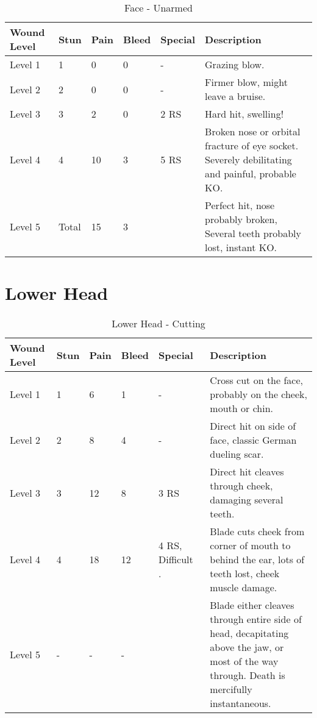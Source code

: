 \documentclass[oneside,11pt,english]{book}
\begin{document}
\begin{table}[!hb] %
	\caption{Face - Unarmed}
	\label{wound:Face - Unarmed}
	\begin{tabu} to 
Wound Level &Stun &Pain &Bleed &Special &Description\\\toprule
Level 1 &1 &0 &0& - &Grazing blow.\\
Level 2 &2 &0 &0& - &Firmer blow, might leave a bruise. \\
Level 3 &3 &2 &0 & 2 RS &Hard hit, swelling!\\
Level 4 &4 &10&3 & 5 RS &Broken nose or orbital fracture of eye socket. Severely debilitating and painful, probable KO.\\
Level 5& Total& 15 &3 & &Perfect hit, nose probably broken, Several teeth probably lost, instant KO.\\
	\end{tabu}
\end{table}
	\clearpage

\section{Lower Head} \vspace{-25pt} \label{sec:lower-head}
\begin{table}[hb] %
	\caption{Lower Head - Cutting}
	\label{wound:Lower Head - Cutting}
	\begin{tabu} to 
Wound Level &Stun &Pain &Bleed &Special &Description\\\toprule
Level 1& 1& 6& 1& - &Cross cut on the face, probably on the cheek, mouth or chin.\\
Level 2& 2& 8& 4& - &Direct hit on side of face, classic German dueling scar.\\
Level 3& 3& 12& 8&  3 RS &Direct hit cleaves through cheek, damaging several teeth.\\
Level 4& 4& 18& 12
	& 4 RS,\newline
		Difficult~ .
	&Blade cuts cheek from corner of mouth to behind the ear, lots of teeth lost, cheek muscle damage.\\
Level 5& - &- &- && Blade either cleaves through entire side of head, decapitating above the jaw, or most of the way through. Death is mercifully instantaneous.\\
	\end{tabu}
\end{table}
\end{document}

